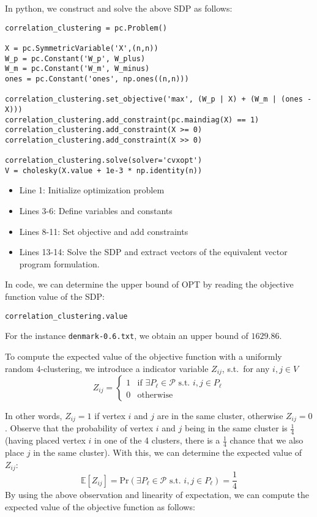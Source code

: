 \documentclass{article}
\begin{document}
In python, we construct and solve the above SDP as follows:
\begin{lstlisting}
correlation_clustering = pc.Problem()

X = pc.SymmetricVariable('X',(n,n))
W_p = pc.Constant('W_p', W_plus)
W_m = pc.Constant('W_m', W_minus)
ones = pc.Constant('ones', np.ones((n,n)))

correlation_clustering.set_objective('max', (W_p | X) + (W_m | (ones - X)))
correlation_clustering.add_constraint(pc.maindiag(X) == 1)
correlation_clustering.add_constraint(X >= 0)
correlation_clustering.add_constraint(X >> 0)

correlation_clustering.solve(solver='cvxopt')
V = cholesky(X.value + 1e-3 * np.identity(n))
\end{lstlisting}

\begin{itemize}
    \item Line 1: Initialize optimization problem
    \item Lines 3-6: Define variables and constants
    \item Lines 8-11: Set objective and add constraints
    \item Lines 13-14: Solve the SDP and extract vectors of the equivalent vector program formulation.
\end{itemize}


In code, we can determine the upper bound of OPT by reading the objective function value of the SDP:
\begin{lstlisting}
correlation_clustering.value
\end{lstlisting}
For the instance \texttt{denmark-0.6.txt}, we obtain an upper bound of $1629.86$.\vspace{1em}

To compute the expected value of the objective function with a uniformly random 4-clustering, we introduce a indicator variable $Z_{ij}$, s.t.~for any $i,j \in V$
\[
    Z_{ij} = \begin{cases}
        1 & \text{if } \exists P_\ell \in \mathcal{P} \text{ s.t. } i,j \in P_\ell\\
        0 & \text{otherwise}
    \end{cases}
\]

In other words, $Z_{ij} = 1$ if vertex $i$ and $j$ are in the same cluster, otherwise $Z_{ij} = 0$. Observe that the probability of vertex $i$ and $j$ being in the same cluster is $\frac{1}{4}$ (having placed vertex $i$ in one of the 4 clusters, there is a $\frac{1}{4}$ chance that we also place $j$ in the same cluster). With this, we can determine the expected value of $Z_{ij}$:
\[
    \mathbb{E}[Z_{ij}] = \text{Pr}(\exists P_\ell \in \mathcal{P} \text{ s.t. }i,j \in P_\ell) = \frac{1}{4}
\]
By using the above observation and linearity of expectation, we can compute the expected value of the objective function as follows:
\end{document}
